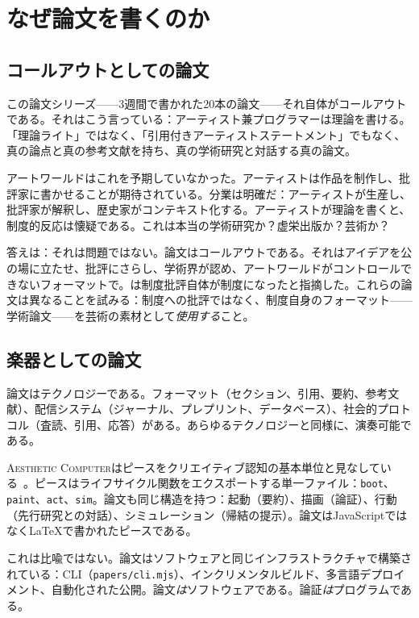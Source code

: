 \documentclass[10pt,letterpaper,twocolumn]{article}
\newcommand{\ac}{\textsc{Aesthetic Computer}}
\begin{document}
\section{なぜ論文を書くのか}

\subsection{コールアウトとしての論文}

この論文シリーズ——3週間で書かれた20本の論文——それ自体がコールアウトである。それはこう言っている：アーティスト兼プログラマーは理論を書ける。「理論ライト」ではなく、「引用付きアーティストステートメント」でもなく、真の論点と真の参考文献を持ち、真の学術研究と対話する真の論文。

アートワールドはこれを予期していなかった。アーティストは作品を制作し、批評家に書かせることが期待されている。分業は明確だ：アーティストが生産し、批評家が解釈し、歴史家がコンテキスト化する。アーティストが理論を書くと、制度的反応は懐疑である。これは本当の学術研究か？虚栄出版か？芸術か？

答えは：それは問題ではない。論文はコールアウトである。それはアイデアを公の場に立たせ、批評にさらし、学術界が認め、アートワールドがコントロールできないフォーマットで。\citet{fraser2005critique}は制度批評自体が制度になったと指摘した。これらの論文は異なることを試みる：制度への批評ではなく、制度自身のフォーマット——学術論文——を芸術の素材として\emph{使用する}こと。

\subsection{楽器としての論文}

論文はテクノロジーである。フォーマット（セクション、引用、要約、参考文献）、配信システム（ジャーナル、プレプリント、データベース）、社会的プロトコル（査読、引用、応答）がある。あらゆるテクノロジーと同様に、演奏可能である。

\ac{}はピースをクリエイティブ認知の基本単位と見なしている~\citep{scudder2026pieces}。ピースはライフサイクル関数をエクスポートする単一ファイル：\texttt{boot}、\texttt{paint}、\texttt{act}、\texttt{sim}。論文も同じ構造を持つ：起動（要約）、描画（論証）、行動（先行研究との対話）、シミュレーション（帰結の提示）。論文はJavaScriptではなく\LaTeX{}で書かれたピースである。

これは比喩ではない。論文はソフトウェアと同じインフラストラクチャで構築されている：CLI（\texttt{papers/cli.mjs}）、インクリメンタルビルド、多言語デプロイメント、自動化された公開。論文\emph{は}ソフトウェアである。論証\emph{は}プログラムである。
\end{document}
